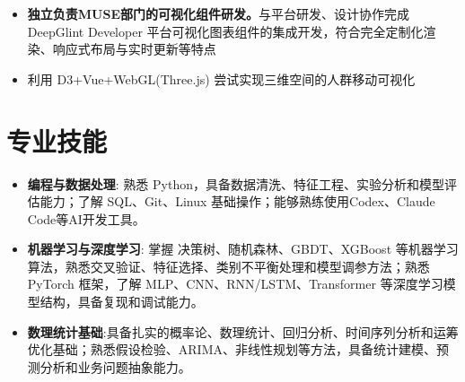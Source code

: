 \documentclass{resume}
\begin{document}
\begin{itemize}
  \item \textbf{独立负责MUSE部门的可视化组件研发。}与平台研发、设计协作完成 DeepGlint Developer 平台可视化图表组件的集成开发，符合完全定制化渲染、响应式布局与实时更新等特点
  \item 利用 D3+Vue+WebGL(Three.js) 尝试实现三维空间的人群移动可视化
\end{itemize}




\section{专业技能}
\begin{itemize}[parsep=0.2ex]
  \item \textbf{编程与数据处理}: 熟悉 Python，具备数据清洗、特征工程、实验分析和模型评估能力；了解 SQL、Git、Linux 基础操作；能够熟练使用Codex、Claude Code等AI开发工具。
  \item \textbf{机器学习与深度学习}: 掌握 决策树、随机森林、GBDT、XGBoost 等机器学习算法，熟悉交叉验证、特征选择、类别不平衡处理和模型调参方法；熟悉 PyTorch 框架，了解 MLP、CNN、RNN/LSTM、Transformer 等深度学习模型结构，具备复现和调试能力。

  \item \textbf{数理统计基础}:具备扎实的概率论、数理统计、回归分析、时间序列分析和运筹优化基础；熟悉假设检验、ARIMA、非线性规划等方法，具备统计建模、预测分析和业务问题抽象能力。
\end{itemize}





%
%
\end{document}
